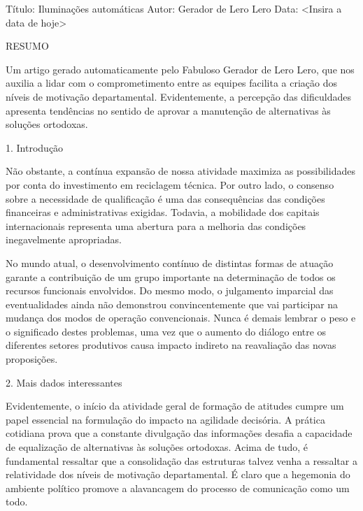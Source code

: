 %
%
%
%

Título: Iluminações automáticas
Autor: Gerador de Lero Lero
Data: <Insira a data de hoje>

RESUMO

Um artigo gerado automaticamente pelo Fabuloso Gerador de Lero Lero, que nos
auxilia a lidar com o comprometimento entre as equipes facilita a criação dos
níveis de motivação departamental. Evidentemente, a percepção das dificuldades
apresenta tendências no sentido de aprovar a manutenção de alternativas às
soluções ortodoxas.

1. Introdução

Não obstante, a contínua expansão de nossa atividade maximiza as possibilidades
por conta do investimento em reciclagem técnica. Por outro lado, o consenso
sobre a necessidade de qualificação é uma das consequências das condições
financeiras e administrativas exigidas. Todavia, a mobilidade dos capitais
internacionais representa uma abertura para a melhoria das condições
inegavelmente apropriadas.

No mundo atual, o desenvolvimento contínuo de distintas formas de atuação
garante a contribuição de um grupo importante na determinação de todos os
recursos funcionais envolvidos. Do mesmo modo, o julgamento imparcial das
eventualidades ainda não demonstrou convincentemente que vai participar na
mudança dos modos de operação convencionais. Nunca é demais lembrar o peso e o
significado destes problemas, uma vez que o aumento do diálogo entre os
diferentes setores produtivos causa impacto indireto na reavaliação das novas
proposições.

2. Mais dados interessantes

Evidentemente, o início da atividade geral de formação de atitudes cumpre um
papel essencial na formulação do impacto na agilidade decisória. A prática
cotidiana prova que a constante divulgação das informações desafia a capacidade
de equalização de alternativas às soluções ortodoxas. Acima de tudo, é
fundamental ressaltar que a consolidação das estruturas talvez venha a
ressaltar a relatividade dos níveis de motivação departamental. É claro que a
hegemonia do ambiente político promove a alavancagem do processo de comunicação
como um todo.

